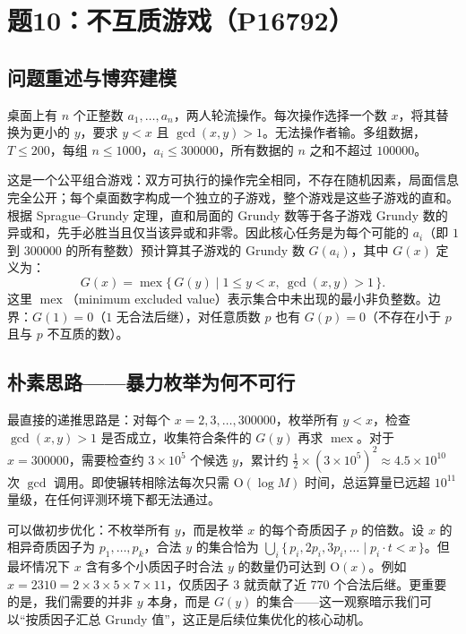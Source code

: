 \section{题10：不互质游戏（P16792）}

\subsection{问题重述与博弈建模}

桌面上有 $n$ 个正整数 $a_1, \dots, a_n$，两人轮流操作。每次操作选择一个数 $x$，将其替换为更小的 $y$，要求 $y < x$ 且 $\gcd(x, y) > 1$。无法操作者输。多组数据，$T \le 200$，每组 $n \le 1000$，$a_i \le 300000$，所有数据的 $n$ 之和不超过 $100000$。

这是一个公平组合游戏：双方可执行的操作完全相同，不存在随机因素，局面信息完全公开；每个桌面数字构成一个独立的子游戏，整个游戏是这些子游戏的直和。根据 Sprague–Grundy 定理，直和局面的 Grundy 数等于各子游戏 Grundy 数的异或和，先手必胜当且仅当该异或和非零。因此核心任务是为每个可能的 $a_i$（即 $1$ 到 $300000$ 的所有整数）预计算其子游戏的 Grundy 数 $G(a_i)$，其中 $G(x)$ 定义为：
\[
G(x) = \operatorname{mex}\{\, G(y) \mid 1 \le y < x,\ \gcd(x, y) > 1 \,\}.
\]
这里 $\operatorname{mex}$（minimum excluded value）表示集合中未出现的最小非负整数。边界：$G(1) = 0$（$1$ 无合法后继），对任意质数 $p$ 也有 $G(p) = 0$（不存在小于 $p$ 且与 $p$ 不互质的数）。

\subsection{朴素思路——暴力枚举为何不可行}

最直接的递推思路是：对每个 $x = 2, 3, \dots, 300000$，枚举所有 $y < x$，检查 $\gcd(x, y) > 1$ 是否成立，收集符合条件的 $G(y)$ 再求 $\operatorname{mex}$。对于 $x = 300000$，需要检查约 $3 \times 10^5$ 个候选 $y$，累计约 $\frac{1}{2} \times (3 \times 10^5)^2 \approx 4.5 \times 10^{10}$ 次 $\gcd$ 调用。即使辗转相除法每次只需 $\mathrm{O}(\log M)$ 时间，总运算量已远超 $10^{11}$ 量级，在任何评测环境下都无法通过。

可以做初步优化：不枚举所有 $y$，而是枚举 $x$ 的每个奇质因子 $p$ 的倍数。设 $x$ 的相异奇质因子为 $p_1, \dots, p_k$，合法 $y$ 的集合恰为 $\bigcup_i \{\, p_i, 2p_i, 3p_i, \dots \mid p_i \cdot t < x \,\}$。但最坏情况下 $x$ 含有多个小质因子时合法 $y$ 的数量仍可达到 $\mathrm{O}(x)$。例如 $x = 2310 = 2 \times 3 \times 5 \times 7 \times 11$，仅质因子 $3$ 就贡献了近 $770$ 个合法后继。更重要的是，我们需要的并非 $y$ 本身，而是 $G(y)$ 的集合——这一观察暗示我们可以“按质因子汇总 Grundy 值”，这正是后续位集优化的核心动机。

